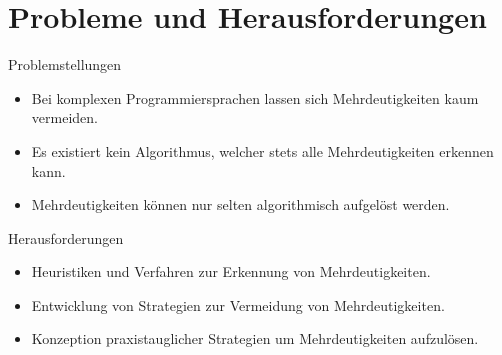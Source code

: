 \documentclass[t]{beamer}
\begin{document}
	\section{Probleme und Herausforderungen}\label{sec:probleme-und-herausforderungen}
	\begin{frame}
		\begin{block}{Problemstellungen}
			\begin{itemize}
				\item Bei komplexen Programmiersprachen lassen sich Mehrdeutigkeiten kaum vermeiden.
				\item Es existiert kein Algorithmus, welcher stets alle Mehrdeutigkeiten erkennen kann.\cite{springer2013}
				\item Mehrdeutigkeiten können nur selten algorithmisch aufgelöst werden.
			\end{itemize}
		\end{block}
		\vspace{2em}
		\begin{block}{Herausforderungen}
			\begin{itemize}
				\item Heuristiken und Verfahren zur Erkennung von Mehrdeutigkeiten.
				\item Entwicklung von Strategien zur Vermeidung von Mehrdeutigkeiten.
				\item Konzeption praxistauglicher Strategien um Mehrdeutigkeiten aufzulösen.
			\end{itemize}
		\end{block}
	\end{frame}
\end{document}
